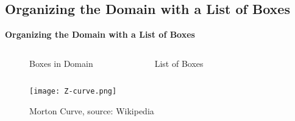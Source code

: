 \subsection{Organizing the Domain with a List of Boxes}
\begin{frame}
    \textbf{Organizing the Domain with a List of Boxes}
    \medskip

    \begin{columns}[c]
    \begin{figure}[h]
        \centering
        \resizebox{.9\textwidth}{!}{%
            
        }
        \caption{Boxes in Domain}
    \end{figure}

    \begin{figure}[h]
        \centering
        \resizebox{.9\textwidth}{!}{%
            
        }
        \caption{List of Boxes}
    \end{figure}
    \end{columns}

\end{frame}


\begin{frame}
    \begin{figure}
        \centering
        \texttt{[image: Z-curve.png]}
        \caption{Morton Curve, source: Wikipedia}
    \end{figure}
\end{frame}


